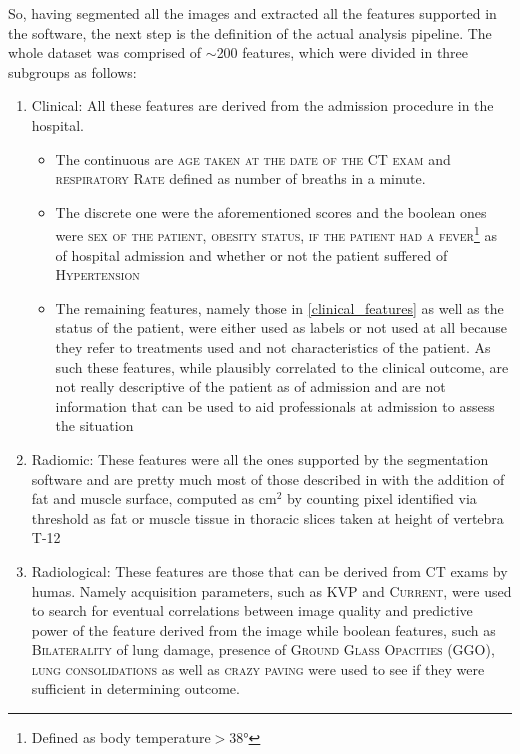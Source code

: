 So, having segmented all the images and extracted all the features supported in the software, the next step is the definition of the actual analysis pipeline. The whole dataset was comprised of $\sim$200 features, which were divided in three subgroups as follows:

\begin{enumerate}
\item Clinical: All these features are derived from the admission procedure in the hospital.
	\begin{itemize}
        \item The continuous are {\scshape age taken at the date of the CT exam} and {\scshape respiratory Rate} defined as number of breaths in a minute.
		\item The discrete one were the aforementioned scores and the boolean ones were {\scshape sex of the patient, obesity status, if the patient had a fever}\footnote{Defined as body temperature$>$38°} as of hospital admission and whether or not the patient suffered of {\scshape Hypertension}
		\item The remaining features, namely those in \ref{clinical_features} as well as the \death status of the patient, were either used as labels or not used at all because they refer to treatments used and not characteristics of the patient. As such these features, while plausibly correlated to the clinical outcome, are not really descriptive of the patient as of admission and are not information that can be used to aid professionals at admission to assess the situation
	\end{itemize}
\item Radiomic: These features were all the ones supported by the segmentation software and are pretty much most of those described in \cite{IBSI} with the addition of fat and muscle surface, computed as cm$^2$ by counting pixel identified via threshold as fat or muscle tissue in thoracic slices taken at height of vertebra T-12
\item Radiological: These features are those that can be derived from CT exams by humas. Namely acquisition parameters, such as {\scshape KVP} and {\scshape Current}, were used to search for eventual correlations between image quality and predictive power of the feature derived from the image while boolean features, such as {\scshape Bilaterality} of lung damage, presence of {\scshape Ground Glass Opacities (GGO)}, {\scshape lung consolidations} as well as {\scshape crazy paving} were used to see if they were sufficient in determining outcome.
\end{enumerate}

